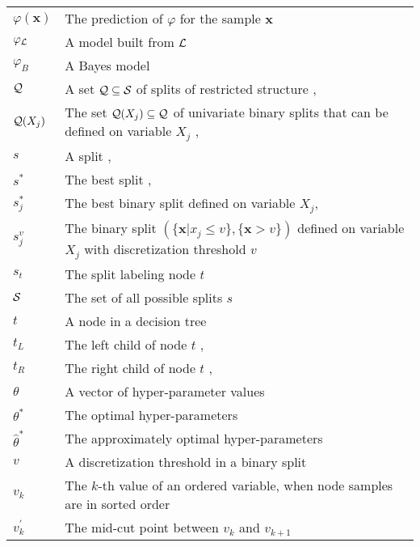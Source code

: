 \begin{tabularx}{\textwidth}{ l X }
$\varphi(\mathbf{x})$ & The prediction of $\varphi$ for the sample $\mathbf{x}$ \dotfill  \pageref{ntn:varphi-x}\\
$\varphi_{\cal L}$ & A model built from ${\cal L}$ \dotfill  \pageref{ntn:varphi-L}\\
$\varphi_B$ & A Bayes model \dotfill  \pageref{ntn:varphi-B}\\
${\cal Q}$ & A set ${\cal Q} \subseteq {\cal S}$ of splits of restricted structure \dotfill \pageref{ntn:Q}, \pageref{ntn:Q2}\\
${\cal Q}(X_j)$ & The set ${\cal Q}(X_j) \subseteq {\cal Q}$ of univariate binary splits that can be defined on variable $X_j$ \dotfill \pageref{ntn:Q_X_j}, \pageref{ntn:Q_X_j2}\\
$s$ & A split \dotfill  \pageref{ntn:s}, \pageref{ntn:s2}\\
$s^*$ & The best split \dotfill  \pageref{ntn:s-star}, \pageref{ntn:s-star2}\\
$s^*_j$ & The best binary split defined on variable $X_j$\dotfill  \pageref{ntn:s-star}, \pageref{ntn:s-star_j}\\
$s_j^v$ & The binary split $(\{\mathbf{x}|x_j \leq v\}, \{\mathbf{x} > v\})$ defined on variable $X_j$ with discretization threshold $v$ \dotfill  \pageref{ntn:s_jv}\\
$s_t$ & The split labeling node $t$ \dotfill  \pageref{ntn:s_t}\\
${\cal S}$ & The set of all possible splits $s$ \dotfill  \pageref{ntn:S-all}\\
$t$ & A node in a decision tree \dotfill  \pageref{ntn:node}\\
$t_L$ & The left child of node $t$ \dotfill \pageref{ntn:t_L}, \pageref{ntn:t_L2}\\
$t_R$ & The right child of node $t$ \dotfill \pageref{ntn:t_R}, \pageref{ntn:t_R2}\\
$\theta$ & A vector of hyper-parameter values \dotfill  \pageref{ntn:theta}\\
$\theta^*$ & The optimal hyper-parameters \dotfill  \pageref{ntn:theta-star}\\
$\widehat{\theta}^*$ & The approximately optimal hyper-parameters \dotfill  \pageref{ntn:theta-star-approx}\\
$v$ & A discretization threshold in a binary split \dotfill  \pageref{ntn:v}\\
$v_k$ & The $k$-th value of an ordered variable, when node samples are in sorted order \dotfill  \pageref{ntn:v_k}\\
$v_k^\prime$ & The mid-cut point between $v_k$ and $v_{k+1}$ \dotfill  \pageref{ntn:v_k_prime}\\

\end{tabularx}
